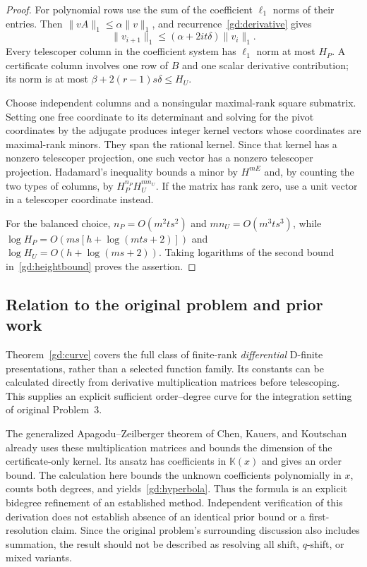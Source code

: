 \begin{proof}
For polynomial rows use the sum of the coefficient $\ell_1$ norms of
their entries. Then $\|vA\|_1\le\alpha\|v\|_1$, and
recurrence~\eqref{gd:derivative} gives
\[
 \|v_{i+1}\|_1\le(\alpha+2it\delta)\|v_i\|_1.
\]
Every telescoper column in the coefficient system has $\ell_1$ norm
at most $H_P$. A certificate column involves one row of $B$ and one
scalar derivative contribution; its norm is at most
$\beta+2(r-1)s\delta\le H_U$.

Choose independent columns and a nonsingular maximal-rank square
submatrix. Setting one free coordinate to its determinant and solving
for the pivot coordinates by the adjugate produces integer kernel
vectors whose coordinates are maximal-rank minors. They span the
rational kernel. Since that kernel has a nonzero telescoper projection,
one such vector has a nonzero telescoper projection. Hadamard's
inequality bounds a minor by $H^{mE}$ and, by counting the two types
of columns, by $H_P^{n_P}H_U^{mn_U}$. If the matrix has rank zero,
use a unit vector in a telescoper coordinate instead.

For the balanced choice,
$n_P=O(m^2ts^2)$ and $mn_U=O(m^3ts^3)$, while
$\log H_P=O(ms[h+\log(mts+2)])$ and
$\log H_U=O(h+\log(ms+2))$.
Taking logarithms of the second bound in~\eqref{gd:heightbound}
proves the assertion.
\end{proof}

\subsection{Relation to the original problem and prior work}

Theorem~\ref{gd:curve} covers the full class of finite-rank
\emph{differential} D-finite presentations, rather than a selected
function family. Its constants can be calculated directly from
derivative multiplication matrices before telescoping. This supplies
an explicit sufficient order--degree curve for the integration setting
of original Problem~3.

The generalized Apagodu--Zeilberger theorem of Chen, Kauers, and
Koutschan~\cite{CKK2014} already uses these multiplication matrices and bounds the
dimension of the certificate-only kernel. Its ansatz has coefficients
in $\mathbb K(x)$ and gives an order bound. The calculation here bounds
the unknown coefficients polynomially in $x$, counts both degrees,
and yields~\eqref{gd:hyperbola}. Thus the formula is an explicit
bidegree refinement of an established method. Independent verification
of this derivation does not establish absence of an identical prior
bound or a first-resolution claim. Since the original problem's
surrounding discussion also includes summation, the result should not
be described as resolving all shift, $q$-shift, or mixed variants.

